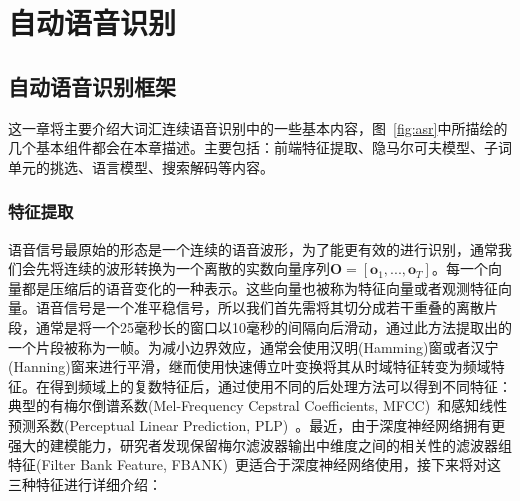 
\chapter{自动语音识别}
\label{chap:intro}
\section{自动语音识别框架}
\label{chap:intro-asr}


这一章将主要介绍大词汇连续语音识别中的一些基本内容，图~\ref{fig:asr}中所描绘的几个基本组件都会在本章描述。主要包括：前端特征提取、隐马尔可夫模型、子词单元的挑选、语言模型、搜索解码等内容。

\subsection{特征提取}
\label{sec:feat_extra}
语音信号最原始的形态是一个连续的语音波形，为了能更有效的进行识别，通常我们会先将连续的波形转换为一个离散的实数向量序列$\mathbf{O}=\left[ \mathbf{o}_1, ..., \mathbf{o}_T \right]$。每一个向量都是压缩后的语音变化的一种表示。这些向量也被称为特征向量或者观测特征向量。语音信号是一个准平稳信号，所以我们首先需将其切分成若干重叠的离散片段，通常是将一个25毫秒长的窗口以10毫秒的间隔向后滑动，通过此方法提取出的一个片段被称为一帧。为减小边界效应，通常会使用汉明(Hamming)窗或者汉宁(Hanning)窗来进行平滑，继而使用快速傅立叶变换将其从时域特征转变为频域特征。在得到频域上的复数特征后，通过使用不同的后处理方法可以得到不同特征：典型的有梅尔倒谱系数(Mel-Frequency Cepstral Coefficients, MFCC)~\cite{davis1980comparison}和感知线性预测系数(Perceptual Linear Prediction, PLP)~\cite{hermansky1990perceptual}。最近，由于深度神经网络拥有更强大的建模能力，研究者发现保留梅尔滤波器输出中维度之间的相关性的滤波器组特征(Filter Bank Feature, FBANK)~\cite{seide2011feature}更适合于深度神经网络使用，接下来将对这三种特征进行详细介绍：
